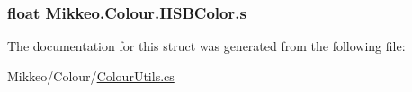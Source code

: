 \subsubsection[{\texorpdfstring{s}{s}}]{\setlength{\rightskip}{0pt plus 5cm}float Mikkeo.\+Colour.\+H\+S\+B\+Color.\+s}\hypertarget{struct_mikkeo_1_1_colour_1_1_h_s_b_color_ab7d0e76376413147a3d5b26f8ed5da1a}{}\label{struct_mikkeo_1_1_colour_1_1_h_s_b_color_ab7d0e76376413147a3d5b26f8ed5da1a}


The documentation for this struct was generated from the following file\+:\begin{DoxyCompactItemize}
\item 
Mikkeo/\+Colour/\hyperlink{_colour_utils_8cs}{Colour\+Utils.\+cs}\end{DoxyCompactItemize}
